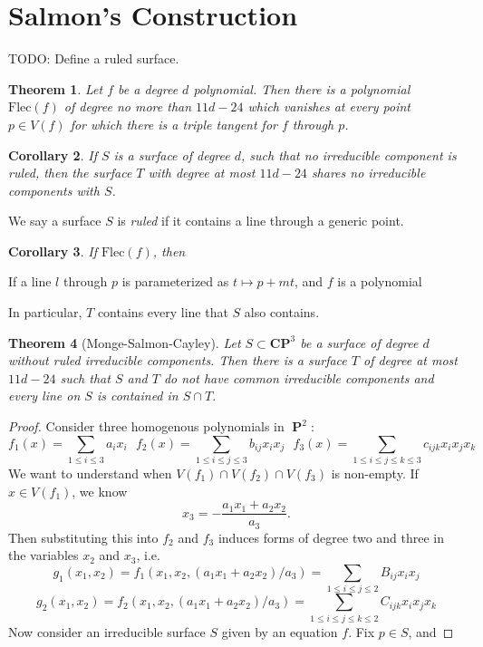 \documentclass{article}
\theoremstyle{plain}
\newtheorem{theorem}{Theorem}
\newtheorem{corollary}[theorem]{Corollary}
\theoremstyle{remark}
\theoremstyle{definition}
\DeclareMathOperator{\PP}{\mathbf{P}}
\begin{document}
\section{Salmon's Construction}

TODO: Define a ruled surface.

\begin{theorem}
    Let $f$ be a degree $d$ polynomial. Then there is a polynomial $\text{Flec}(f)$ of degree no more than $11d - 24$ which vanishes at every point $p \in V(f)$ for which there is a triple tangent for $f$ through $p$.
\end{theorem}

\begin{corollary}
    If $S$ is a surface of degree $d$, such that no irreducible component is ruled, then the surface $T$ with degree at most $11d - 24$ shares no irreducible components with $S$.
\end{corollary}

We say a surface $S$ is {\it ruled} if it contains a line through a generic point.

\begin{corollary}
    If $\text{Flec}(f)$, then 
\end{corollary}

If a line $l$ through $p$ is parameterized as $t \mapsto p + mt$, and $f$ is a polynomial 

In particular, $T$ contains every line that $S$ also contains.

\begin{theorem}[Monge-Salmon-Cayley]
    Let $S \subset \mathbf{CP}^3$ be a surface of degree $d$ without ruled irreducible components. Then there is a surface $T$ of degree at most $11d - 24$ such that $S$ and $T$ do not have common irreducible components and every line on $S$ is contained in $S \cap T$.
\end{theorem}
\begin{proof}
    Consider three homogenous polynomials in $\PP^2$:
    \[ f_1(x) = \sum_{1 \leq i \leq 3} a_ix_i\ \ \ f_2(x) = \sum_{1 \leq i \leq j \leq 3} b_{ij} x_i x_j\ \ \ f_3(x) = \sum_{1 \leq i \leq j \leq k \leq 3} c_{ijk} x_i x_j x_k \]
    We want to understand when $V(f_1) \cap V(f_2) \cap V(f_3)$ is non-empty. If $x \in V(f_1)$, we know
    \[ x_3 = -\frac{a_1x_1+a_2x_2}{a_3}. \]
    Then substituting this into $f_2$ and $f_3$ induces forms of degree two and three in the variables $x_2$ and $x_3$, i.e.
    \[ g_1(x_1,x_2) = f_1(x_1,x_2,(a_1x_1 + a_2x_2)/a_3) = \sum_{1 \leq i \leq j \leq 2} B_{ij} x_ix_j \]
    \[ g_2(x_1,x_2) = f_2(x_1,x_2,(a_1x_1 + a_2x_2)/a_3) = \sum_{1 \leq i \leq j \leq k \leq 2} C_{ijk} x_ix_jx_k \]
    Now consider an irreducible surface $S$ given by an equation $f$. Fix $p \in S$, and 
\end{proof}
\end{document}
